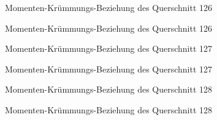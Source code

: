 \documentclass[
  11pt,
  letterpaper,
]{scrreprt}
\begin{document}
\begin{figure}[H]


\caption{\label{fig-qs_126}Momenten-Krümmungs-Beziehung des Querschnitt
126}

\end{figure}%

\begin{figure}[H]


\caption{\label{fig-m_chi_126}Momenten-Krümmungs-Beziehung des
Querschnitt 126}

\end{figure}%

\begin{figure}[H]


\caption{\label{fig-qs_127}Momenten-Krümmungs-Beziehung des Querschnitt
127}

\end{figure}%

\begin{figure}[H]


\caption{\label{fig-m_chi_127}Momenten-Krümmungs-Beziehung des
Querschnitt 127}

\end{figure}%

\begin{figure}[H]


\caption{\label{fig-qs_128}Momenten-Krümmungs-Beziehung des Querschnitt
128}

\end{figure}%

\begin{figure}[H]


\caption{\label{fig-m_chi_128}Momenten-Krümmungs-Beziehung des
Querschnitt 128}

\end{figure}%
\end{document}
